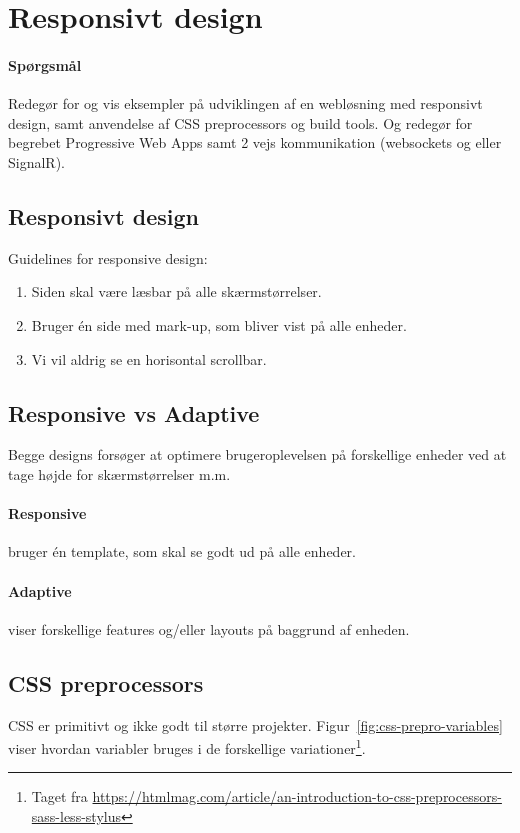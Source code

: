 \section{Responsivt design}

\paragraph{Spørgsmål}
Redegør for og vis eksempler på udviklingen af en webløsning med responsivt design, samt anvendelse af CSS preprocessors og build tools. Og redegør for begrebet Progressive Web Apps samt 2 vejs	kommunikation (websockets og eller SignalR).

\subsection{Responsivt design}
Guidelines for responsive design:

\begin{enumerate}
	\item Siden skal være læsbar på alle skærmstørrelser.
	\item Bruger én side med mark-up, som bliver vist på alle enheder.
	\item Vi vil aldrig se en horisontal scrollbar.
\end{enumerate}

\subsection{Responsive vs Adaptive}
Begge designs forsøger at optimere brugeroplevelsen på forskellige enheder ved at tage højde for skærmstørrelser m.m.

\paragraph{Responsive} bruger én template, som skal se godt ud på alle enheder.

\paragraph{Adaptive} viser forskellige features og/eller layouts på baggrund af enheden.

\subsection{CSS preprocessors}
CSS er primitivt og ikke godt til større projekter. Figur~\ref{fig:css-prepro-variables} viser hvordan variabler bruges i de forskellige variationer\footnote{Taget fra \url{https://htmlmag.com/article/an-introduction-to-css-preprocessors-sass-less-stylus}}. 

